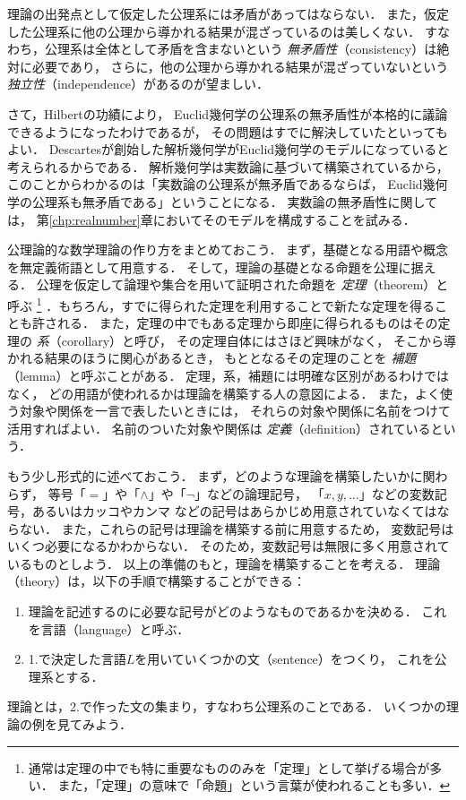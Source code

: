   理論の出発点として仮定した公理系には矛盾があってはならない．
  また，仮定した公理系に他の公理から導かれる結果が混ざっているのは美しくない．
  すなわち，公理系は全体として矛盾を含まないという
  \emph{無矛盾性}（consistency）は絶対に必要であり，
  さらに，他の公理から導かれる結果が混ざっていないという
  \emph{独立性}（independence）があるのが望ましい．

  さて，Hilbertの功績により，
  Euclid幾何学の公理系の無矛盾性が本格的に議論できるようになったわけであるが，
  その問題はすでに解決していたといってもよい．
  Descartesが創始した解析幾何学がEuclid幾何学のモデルになっていると考えられるからである．
  解析幾何学は実数論に基づいて構築されているから，
  このことからわかるのは「実数論の公理系が無矛盾であるならば，
  Euclid幾何学の公理系も無矛盾である」ということになる．
  実数論の無矛盾性に関しては，
  第\ref{chp:realnumber}章においてそのモデルを構成することを試みる．
  
  公理論的な数学理論の作り方をまとめておこう．
  まず，基礎となる用語や概念を無定義術語として用意する．
  そして，理論の基礎となる命題を公理に据える．
  公理を仮定して論理や集合を用いて証明された命題を
  \emph{定理}（theorem）と呼ぶ
  \footnote{通常は定理の中でも特に重要なもののみを「定理」として挙げる場合が多い．
  また，「定理」の意味で「命題」という言葉が使われることも多い．}
  ．もちろん，すでに得られた定理を利用することで新たな定理を得ることも許される．
  また，定理の中でもある定理から即座に得られるものはその定理の
  \emph{系}（corollary）と呼び，
  その定理自体にはさほど興味がなく，
  そこから導かれる結果のほうに関心があるとき，
  もととなるその定理のことを
  \emph{補題}（lemma）と呼ぶことがある．
  定理，系，補題には明確な区別があるわけではなく，
  どの用語が使われるかは理論を構築する人の意図による．
  また，よく使う対象や関係を一言で表したいときには，
  それらの対象や関係に名前をつけて活用すればよい．
  名前のついた対象や関係は
  \emph{定義}（definition）されているという．

  もう少し形式的に述べておこう．
  まず，どのような理論を構築したいかに関わらず，
  等号「$=$」や「$\land$」や「$\lnot$」などの論理記号，
  「$x,y, \ldots$」などの変数記号，あるいはカッコやカンマ
  などの記号はあらかじめ用意されていなくてはならない．
  また，これらの記号は理論を構築する前に用意するため，
  変数記号はいくつ必要になるかわからない．
  そのため，変数記号は無限に多く用意されているものとしよう．
  以上の準備のもと，理論を構築することを考える．
  理論（theory）は，以下の手順で構築することができる：
  \begin{enumerate}[1. ]
    \item 理論を記述するのに必要な記号がどのようなものであるかを決める．
      これを言語（language）と呼ぶ．
    \item 1.で決定した言語$L$を用いていくつかの文（sentence）をつくり，
      これを公理系とする．
  \end{enumerate}
  理論とは，2.で作った文の集まり，すなわち公理系のことである．
  いくつかの理論の例を見てみよう．

